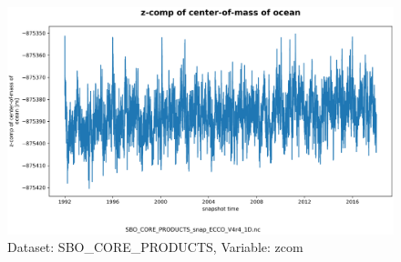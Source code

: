\begin{figure}[H]
\centering
\includegraphics[scale=0.55]{../images/plots/v4r4/oneD_plots/SBO_Core_Products/zcom.png}
\caption{Dataset: SBO\_CORE\_PRODUCTS, Variable: zcom}
\label{tab:table-SBO_CORE_PRODUCTS_zcom-Plot}
\end{figure}
\newpage
\pagebreak
